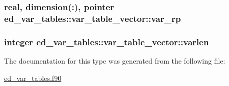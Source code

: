 \subsubsection[{\texorpdfstring{var\+\_\+rp}{var_rp}}]{\setlength{\rightskip}{0pt plus 5cm}real, dimension(\+:), pointer ed\+\_\+var\+\_\+tables\+::var\+\_\+table\+\_\+vector\+::var\+\_\+rp}\hypertarget{structed__var__tables_1_1var__table__vector_a35e8e3abcb12f944efbeb95a982e7d88}{}\label{structed__var__tables_1_1var__table__vector_a35e8e3abcb12f944efbeb95a982e7d88}
\subsubsection[{\texorpdfstring{varlen}{varlen}}]{\setlength{\rightskip}{0pt plus 5cm}integer ed\+\_\+var\+\_\+tables\+::var\+\_\+table\+\_\+vector\+::varlen}\hypertarget{structed__var__tables_1_1var__table__vector_a53166b674050c25a50ccbe6788f8ddcb}{}\label{structed__var__tables_1_1var__table__vector_a53166b674050c25a50ccbe6788f8ddcb}


The documentation for this type was generated from the following file\+:\begin{DoxyCompactItemize}
\item 
\hyperlink{ed__var__tables_8f90}{ed\+\_\+var\+\_\+tables.\+f90}\end{DoxyCompactItemize}
